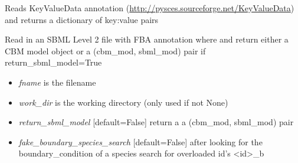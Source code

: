\documentclass[a4paper,11pt,english]{sphinxmanual}
\begin{document}

\begin{fulllineitems}
\label{modules_doc:cbmpy.CBXML.sbml_readKeyValueDataAnnotation}
Reads KeyValueData annotation (\href{http://pysces.sourceforge.net/KeyValueData}{http://pysces.sourceforge.net/KeyValueData}) and returns a dictionary of key:value pairs

\end{fulllineitems}


\begin{fulllineitems}
\label{modules_doc:cbmpy.CBXML.sbml_readSBML2FBA}
Read in an SBML Level 2 file with FBA annotation where and return either a CBM model object
or a (cbm\_mod, sbml\_mod) pair if return\_sbml\_model=True
\begin{itemize}
\item {} 
\emph{fname} is the filename

\item {} 
\emph{work\_dir} is the working directory (only used if not None)

\item {} 
\emph{return\_sbml\_model} {[}default=False{]} return a a (cbm\_mod, sbml\_mod) pair

\item {} 
\emph{fake\_boundary\_species\_search} {[}default=False{]} after looking for the boundary\_condition of a species search for overloaded id's \textless{}id\textgreater{}\_b

\end{itemize}

\end{fulllineitems}

\end{document}
